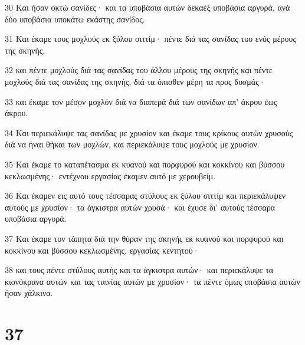 \par 30 Και ήσαν οκτώ σανίδες· και τα υποβάσια αυτών δεκαέξ υποβάσια αργυρά, ανά δύο υποβάσια υποκάτω εκάστης σανίδος.
\par 31 Και έκαμε τους μοχλούς εκ ξύλου σιττίμ· πέντε διά τας σανίδας του ενός μέρους της σκηνής,
\par 32 και πέντε μοχλούς διά τας σανίδας του άλλου μέρους της σκηνής και πέντε μοχλούς διά τας σανίδας της σκηνής, διά τα όπισθεν μέρη τα προς δυσμάς·
\par 33 και έκαμε τον μέσον μοχλόν διά να διαπερά διά των σανίδων απ' άκρου έως άκρου.
\par 34 Και περιεκάλυψε τας σανίδας με χρυσίον και έκαμε τους κρίκους αυτών χρυσούς διά να ήναι θήκαι των μοχλών, και περιεκάλυψε τους μοχλούς με χρυσίον.
\par 35 Και έκαμε το καταπέτασμα εκ κυανού και πορφυρού και κοκκίνου και βύσσου κεκλωσμένης· εντέχνου εργασίας έκαμεν αυτό με χερουβείμ.
\par 36 Και έκαμεν εις αυτό τους τέσσαρας στύλους εκ ξύλου σιττίμ και περιεκάλυψεν αυτούς με χρυσίον· τα άγκιστρα αυτών χρυσά· και έχυσε δι' αυτούς τέσσαρα υποβάσια αργυρά.
\par 37 Και έκαμε τον τάπητα διά την θύραν της σκηνής εκ κυανού και πορφυρού και κοκκίνου και βύσσου κεκλωσμένης, εργασίας κεντητού·
\par 38 και τους πέντε στύλους αυτής και τα άγκιστρα αυτών· και περιεκάλυψε τα κιονόκρανα αυτών και τας ταινίας αυτών με χρυσίον· τα πέντε όμως υποβάσια αυτών ήσαν χάλκινα.

\chapter{37}

